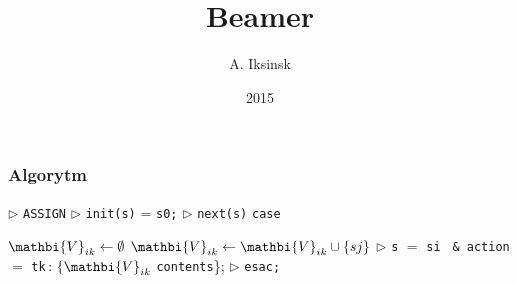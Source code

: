 \documentclass{beamer}
\title{Beamer}
\author{A. Iksinsk}
\institute{Wydzial WAlilB \\
Katedra Informatyki Stosowanej}
\date{2015}
\begin{document}
\begin{frame}
\titlepage	
\end{frame}


\begin{frame}[fragile]
\frametitle{Algorytm}

\State $\triangleright$ \verb!ASSIGN! 
\State $\triangleright$ \verb!init(s)! = \verb!s0;! 
\State $\triangleright$ \verb!next(s)! \coloneqq \verb!case!

	
		
		\State $\mathbi{V}_{ik} \gets \emptyset$
			
                        
                        \State $\mathbi{V}_{ik} \leftarrow \mathbi{V}_{ik} \cup \{sj\}$
                \EndIf
        \EndFor
                \State $\triangleright$ \verb!s! $=$ \verb!si! \verb! & action! $=$ \verb!tk!$\colon  \{\mathbi{V}_{ik}$ \verb!contents!\};
        \EndFor
\EndFor
\State $\triangleright$ \verb!esac;!


\end{frame}
 
 
\end{document}
